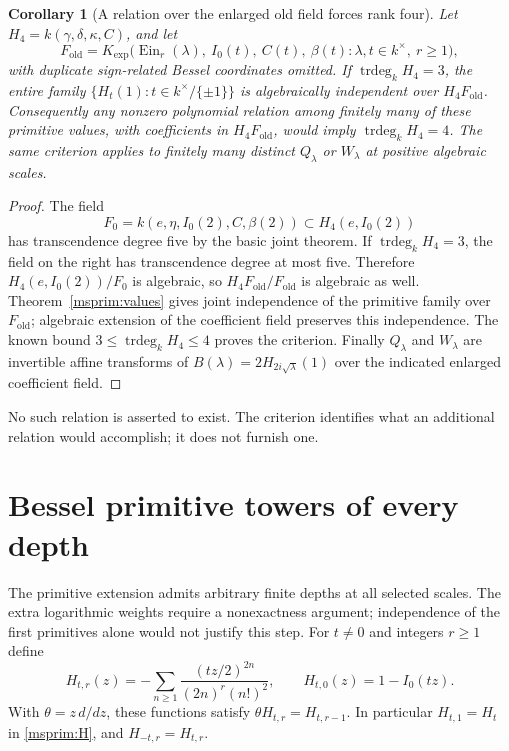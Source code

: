 \documentclass[11pt]{article}
\newtheorem{corollary}[theorem]{Corollary}
\theoremstyle{definition}
\theoremstyle{remark}
\newcommand{\Ein}{\operatorname{Ein}}
\begin{document}
\begin{corollary}[A relation over the enlarged old field forces rank four]
\label{msprim:rankcriterion}
Let $H_4=k(\gamma,\delta,\kappa,C)$, and let
\[
 F_{\mathrm{old}}=K_{\exp}\bigl(
 \Ein_r(\lambda),\ I_0(t),\ C(t),\ \beta(t):
 \lambda,t\in k^\times,\ r\ge1\bigr),
\]
with duplicate sign-related Bessel coordinates omitted.
If $\operatorname{trdeg}_kH_4=3$, the entire family
$\{H_t(1):t\in k^\times/\{\pm1\}\}$ is algebraically independent
 over $H_4F_{\mathrm{old}}$.
Consequently any nonzero polynomial relation among finitely many
of these primitive values, with coefficients in $H_4F_{\mathrm{old}}$,
would imply $\operatorname{trdeg}_kH_4=4$.
The same criterion applies to finitely many distinct $Q_\lambda$
or $W_\lambda$ at positive algebraic scales.
\end{corollary}
\begin{proof}
The field
\[
 F_0=k(e,\eta,I_0(2),C,\beta(2))
 \subset H_4(e,I_0(2))
\]
has transcendence degree five by the basic joint theorem.
If $\operatorname{trdeg}_kH_4=3$, the field on the right has
transcendence degree at most five. Therefore
$H_4(e,I_0(2))/F_0$ is algebraic, so
$H_4F_{\mathrm{old}}/F_{\mathrm{old}}$ is algebraic as well.
Theorem~\ref{msprim:values} gives joint independence of the primitive
family over $F_{\mathrm{old}}$; algebraic extension of the coefficient
field preserves this independence. The known bound
$3\le\operatorname{trdeg}_kH_4\le4$ proves the criterion.
Finally $Q_\lambda$ and $W_\lambda$ are invertible affine transforms
of $B(\lambda)=2H_{2i\sqrt\lambda}(1)$ over the indicated enlarged
coefficient field.
\end{proof}
No such relation is asserted to exist. The criterion identifies what
an additional relation would accomplish; it does not furnish one.

\section{Bessel primitive towers of every depth}
\label{depth:section}

The primitive extension admits arbitrary finite depths at all selected
scales.  The extra logarithmic weights require a nonexactness argument;
independence of the first primitives alone would not justify this step.
For $t\ne0$ and integers $r\ge1$ define
\begin{equation}\label{depth:definition}
 H_{t,r}(z)=-\sum_{n\ge1}
       \frac{(tz/2)^{2n}}{(2n)^r(n!)^2},\qquad
 H_{t,0}(z)=1-I_0(tz).
\end{equation}
With $\theta=z\,d/dz$, these functions satisfy
$\theta H_{t,r}=H_{t,r-1}$.  In particular $H_{t,1}=H_t$ in
\eqref{msprim:H}, and $H_{-t,r}=H_{t,r}$.
\end{document}

